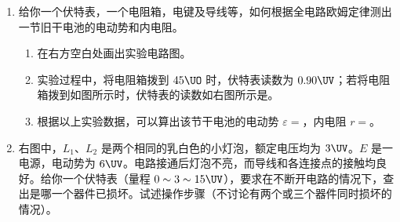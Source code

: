 \documentclass[\gkver]{gaokaozhenti}
\begin{document}
\begin{enumerate}


\item
给你一个伏特表，一个电阻箱，电键及导线等，如何根据全电路欧姆定律测出一节旧干电池的电动势和内电阻。
\begin{enumerate}
	\item
	在右方空白处画出实验电路图。

	\item
	实验过程中，将电阻箱拨到 $45\UO$ 时，伏特表读数为 $0.90\UV$；若将电阻箱拨到如图所示\tkanswer{$110\UO$}时，伏特表的读数如右图所示是\tkanswer{$1.10\UV$}。

	\item
	根据以上实验数据，可以算出该节干电池的电动势 $\varepsilon=$\tkanswer{$1.3\UV$}，内电阻 $r=$\tkanswer{$20\UO$}。
\end{enumerate}



\item
右图中，$L_{1}$、$L_{2}$ 是两个相同的乳白色的小灯泡，额定电压均为 $3\UV$。$E$ 是一电源，电动势为 $6\UV$。电路接通后灯泡不亮，而导线和各连接点的接触均良好。给你一个伏特表（量程 $0\sim3\sim15\UV$），要求在不断开电路的情况下，查出是哪一个器件已损坏。试述操作步骤（不讨论有两个或三个器件同时损坏的情况）。
\onepicture[align=right, w=3.36cm]{}


\end{enumerate}
\end{document}
